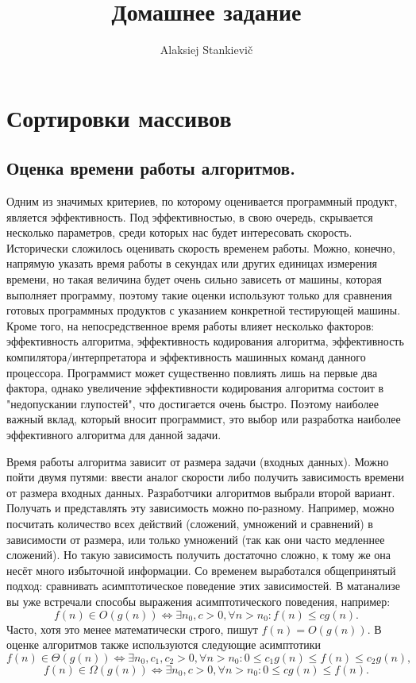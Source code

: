 \documentclass[12pt]{article}
\author{Alaksiej Stankievič}
\title{Домашнее задание}
\begin{document}

\section{Сортировки массивов}
\subsection{Оценка времени работы алгоритмов.}
Одним из значимых критериев, по которому оценивается программный продукт, является эффективность. Под эффективностью, в свою очередь, скрывается несколько параметров, среди которых нас будет интересовать скорость. Исторически сложилось оценивать скорость временем работы. Можно, конечно, напрямую указать время работы в секундах или других единицах  измерения времени, но такая величина будет очень сильно зависеть от машины, которая выполняет программу, поэтому такие оценки используют только для сравнения готовых программных продуктов с указанием конкретной тестирующей машины. Кроме того, на непосредственное время работы влияет несколько факторов: эффективность алгоритма, эффективность кодирования алгоритма, эффективность компилятора/интерпретатора и эффективность машинных команд данного процессора. Программист может существенно повлиять лишь на первые два фактора, однако увеличение эффективности кодирования алгоритма состоит в "недопускании глупостей", что достигается очень быстро. Поэтому наиболее важный 
вклад, который вносит программист, это выбор или разработка наиболее эффективного алгоритма для данной задачи.

Время работы алгоритма зависит от размера задачи (входных данных). Можно пойти двумя путями: ввести аналог скорости либо получить зависимость времени от размера входных данных. Разработчики алгоритмов выбрали второй вариант. Получать и представлять эту зависимость можно по-разному.  Например, можно посчитать количество всех действий (сложений, умножений и сравнений) в зависимости от размера, или только умножений (так как они часто медленнее сложений). Но такую зависимость получить достаточно сложно, к тому же она несёт много избыточной информации. Со временем выработался общепринятый подход: сравнивать асимптотическое поведение этих зависимостей. В матанализе вы уже встречали способы выражения асимптотического поведения, например:
\begin{equation}
f(n)\in{}O(g(n)) \Leftrightarrow{} \exists{n_{0}, c>0}, \forall{n>n_{0}}: f(n)\leq{}cg(n).
\end{equation}
Часто, хотя это менее математически строго, пишут $f(n)=O(g(n))$. В оценке алгоритмов также используются следующие асимптотики
\begin{equation}
f(n)\in{}\Theta(g(n)) \Leftrightarrow{} \exists{n_{0},c_{1},c_{2}>0}, \forall{n>n_{0}}:0\leq{}c_{1}g(n)\leq{}f(n)\leq{}c_{2}g(n),
\end{equation}
\begin{equation}
f(n)\in{}\Omega(g(n)) \Leftrightarrow{} \exists{n_{0},c>0}, \forall{n>n_{0}}:0\leq{}cg(n)\leq{}f(n).
\end{equation}
\end{document}
